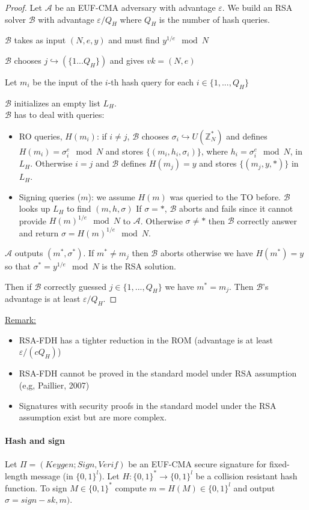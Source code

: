 \documentclass{article}
\newcommand{\Rem}{\underline{Remark:} }
\newcommand{\Z}{\mathbb{Z}}
\newcommand{\A}{\mathcal{A}}
\newcommand{\B}{\mathcal{B}}
\newcommand{\bit}{\{0,1\}}
\renewcommand{\epsilon}{\varepsilon}
\begin{document}
\begin{proof}
Let $\A$ be an EUF-CMA adversary with advantage $\epsilon$. We build an RSA solver $\B$ with advantage $\epsilon/Q_H$ where $Q_H$ is the number of hash queries.

$\B$ takes as input $(N,e,y)$ and must find $y^{1/e}\mod{N}$

$\B$ chooses $j\hookrightarrow(\{1...Q_H\})$ and gives $vk=(N,e)$

Let $m_i$ be the input of the $i$-th hash query for each $i\in\{1,...,Q_H\}$

$\B$ initializes an empty list $L_H$.
\\
$\B$ has to deal with queries:
\begin{itemize}
\item RO queries, $H(m_i)$: if $i\neq j$, $\B$ chooses $\sigma_i\hookrightarrow U(\Z_N^*)$ and defines $H(m_i)=\sigma_i^e\mod{N}$ and stores $\{(m_i,h_i,\sigma_i)\}$, where $h_i=\sigma_i^e\mod{N}$, in $L_H$. Otherwise $i=j$ and $\B$ defines $H(m_j)=y$ and stores $\{(m_j,y,\ast)\}$ in $L_H$.

\item Signing queries ($m$): we assume $H(m)$ was queried to the TO before. $\B$ looks up $L_H$ to find $(m,h,\sigma)$ If $\sigma=\ast$, $\B$ aborts and fails since it cannot provide $H(m)^{1/e}\mod{N}$ to $\A$. Otherwise $\sigma\neq\ast$ then $\B$ correctly answer and return $\sigma=H(m)^{1/e}\mod{N}$.
\end{itemize}

$\A$ outputs $(m^*,\sigma^*)$. If $m^*\neq m_j$ then $\B$ aborts otherwise we have $H(m^*)=y$ so that $\sigma^*=y^{1/e}\mod{N}$ is the RSA solution.

Then if $\B$ correctly guessed $j\in\{1,...,Q_H\}$ we have $m^*=m_j$. Then $\B$'s advantage is at least $\epsilon/Q_H$.
\end{proof}

\Rem \begin{itemize}
\item RSA-FDH has a tighter reduction in the ROM (advantage is at least $\epsilon/(cQ_H)$)
\item RSA-FDH cannot be proved in the standard model under RSA assumption (e,g, Paillier, 2007)
\item Signatures with security proofs in the standard model under the RSA assumption exist but are more complex.
\end{itemize}

\paragraph{Hash and sign} Let $\Pi=(Keygen;Sign,Verif)$ be an EUF-CMA secure signature for fixed-length message (in $\bit^l$). Let $H:\bit^*\rightarrow\bit^l$ be a collision resistant hash function. To sign $M\in\bit^*$ compute $m=H(M)\in\bit^l$ and output $\sigma=sign-sk,m)$.
\end{document}
